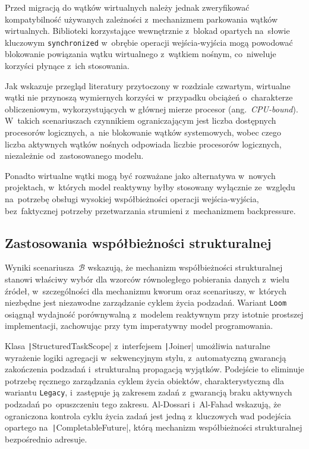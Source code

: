 Przed migracją do wątków wirtualnych należy jednak zweryfikować kompatybilność używanych zależności z~mechanizmem parkowania wątków wirtualnych. Biblioteki korzystające wewnętrznie z~blokad opartych na~słowie kluczowym \texttt{synchronized} w~obrębie operacji wejścia-wyjścia mogą powodować blokowanie powiązania wątku wirtualnego z~wątkiem nośnym, co~niweluje korzyści płynące z~ich stosowania.

Jak wskazuje przegląd literatury przytoczony w rozdziale czwartym, wirtualne wątki nie przynoszą wymiernych korzyści w~przypadku obciążeń o~charakterze obliczeniowym, wykorzystujących w głównej mierze procesor (ang.~\emph{CPU-bound}). W~takich scenariuszach czynnikiem ograniczającym jest liczba dostępnych procesorów logicznych, a~nie blokowanie wątków systemowych, wobec czego liczba aktywnych wątków nośnych odpowiada liczbie procesorów logicznych, niezależnie od~zastosowanego modelu.

Ponadto wirtualne wątki mogą być rozważane jako alternatywa w~nowych projektach, w~których model reaktywny byłby stosowany wyłącznie ze~względu na~potrzebę obsługi wysokiej współbieżności operacji wejścia-wyjścia, bez~faktycznej potrzeby przetwarzania strumieni z~mechanizmem backpressure.

\subsection{Zastosowania współbieżności strukturalnej}

Wyniki scenariusza~$\mathcal{B}$ wskazują, że mechanizm współbieżności strukturalnej stanowi właściwy wybór dla wzorców równoległego pobierania danych z~wielu źródeł, w~szczególności dla mechanizmu kworum oraz scenariuszy, w~których niezbędne jest niezawodne zarządzanie cyklem życia podzadań. Wariant \texttt{Loom} osiągnął wydajność porównywalną z~modelem reaktywnym przy istotnie prostszej implementacji, zachowując przy tym imperatywny model programowania.

Klasa \texttt|StructuredTaskScope| z~interfejsem \texttt|Joiner| umożliwia naturalne wyrażenie logiki agregacji w~sekwencyjnym stylu, z~automatyczną gwarancją zakończenia podzadań i~strukturalną propagacją wyjątków. Podejście to eliminuje potrzebę ręcznego zarządzania cyklem życia obiektów, charakterystyczną dla wariantu \texttt{Legacy}, i~zastępuje ją zakresem zadań z~gwarancją braku aktywnych podzadań po~opuszczeniu tego zakresu. Al-Dossari i~Al-Fahad \cite{dossari2024} wskazują, że ograniczona kontrola cyklu życia zadań jest jedną z~kluczowych wad podejścia opartego na~\texttt|CompletableFuture|, którą mechanizm współbieżności strukturalnej bezpośrednio adresuje.

